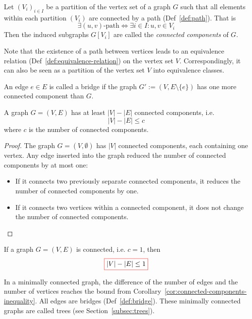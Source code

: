 \begin{definition}\label{def:connected-components}
Let \((V_i)_{i \in I}\) be a partition of the vertex set of a graph \(G\) such that all elements within each partition \((V_i)\) are connected by a path (Def~\ref{def:path}).
That is
\[
\exists \text{$(u,v)$-path} \iff \exists i \in I: u,v \in V_i
\]
Then the induced subgraphs \(G[V_i]\) are called the \emph{connected components} of \(G\).
\end{definition}
Note that the existence of a path between vertices leads to an equivalence relation (Def~\ref{def:equivalence-relation}) on the vertex set \(V\).
Correspondingly, it can also be seen as a partition of the vertex set \(V\) into equivalence classes.

\begin{definition}[Bridge]\label{def:bridge}
An edge \(e\in E\) is called a bridge if the graph \(G' := (V,E\setminus\{e\})\) has one more connected component than \(G\).
\end{definition}

\begin{theorem}\label{thm:connected-components-inequality}
A graph \(G = (V,E)\) has at least \(|V| - |E|\) connected components, i.e.
\[
  |V| - |E| \leq c
\]
where \(c\) is the number of connected components.
\end{theorem}
\begin{proof}
  The graph \(G = (V,\emptyset)\) has \(|V|\) connected components, each containing one vertex.
  Any edge inserted into the graph reduced the number of connected components by at most one:
  \begin{itemize}
  \item If it connects two previously separate connected components, it reduces the number of connected components by one.
  \item If it connects two vertices within a connected component, it does not change the number of connected components. \qedhere
  \end{itemize}
\end{proof}

\begin{corollary}
  \label{cor:connected-components-inequality}
  If a graph \(G = (V,E)\) is connected, i.e. \(c=1\), then
  \[\fcolorbox{red}{white}{$\displaystyle
    |V| - |E| \leq 1
    $} \qedhere
  \]
\end{corollary}

In a minimally connected graph, the diﬀerence of the number of edges and the number of vertices reaches the bound from Corollary~\ref{cor:connected-components-inequality}.
All edges are bridges (Def~\ref{def:bridge}).
These minimally connected graphs are called trees (see Section~\ref{subsec:trees}).


